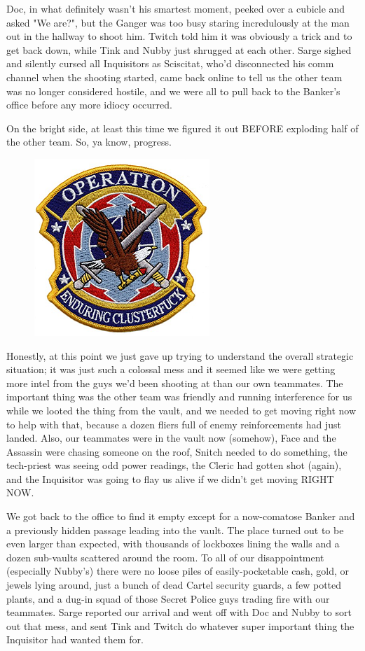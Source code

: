 Doc, in what definitely wasn't his smartest moment, peeked over a cubicle and asked "We are?", but the Ganger was too busy staring incredulously at the man out in the hallway to shoot him. 
Twitch told him it was obviously a trick and to get back down, while Tink and Nubby just shrugged at each other. 
Sarge sighed and silently cursed all Inquisitors as Sciscitat, who'd disconnected his comm channel when the shooting started, came back online to tell us the other team was no longer considered hostile, and we were all to pull back to the Banker's office before any more idiocy occurred.

On the bright side, at least this time we figured it out BEFORE exploding half of the other team. 
So, ya know, progress.

\begin{figure}
	\begin{center}
		\includegraphics[width=\figwidth]{pics/18/33.png}
	\end{center}
\end{figure}
Honestly, at this point we just gave up trying to understand the overall strategic situation; 
it was just such a colossal mess and it seemed like we were getting more intel from the guys we'd been shooting at than our own teammates. 
The important thing was the other team was friendly and running interference for us while we looted the thing from the vault, and we needed to get moving right now to help with that, because a dozen fliers full of enemy reinforcements had just landed. 
Also, our teammates were in the vault now (somehow), Face and the Assassin were chasing someone on the roof, Snitch needed to do something, the tech-priest was seeing odd power readings, the Cleric had gotten shot (again), and the Inquisitor was going to flay us alive if we didn't get moving RIGHT NOW.

We got back to the office to find it empty except for a now-comatose Banker and a previously hidden passage leading into the vault. 
The place turned out to be even larger than expected, with thousands of lockboxes lining the walls and a dozen sub-vaults scattered around the room. 
To all of our disappointment (especially Nubby's) there were no loose piles of easily-pocketable cash, gold, or jewels lying around, just a bunch of dead Cartel security guards, a few potted plants, and a dug-in squad of those Secret Police guys trading fire with our teammates. 
Sarge reported our arrival and went off with Doc and Nubby to sort out that mess, and sent Tink and Twitch do whatever super important thing the Inquisitor had wanted them for.

